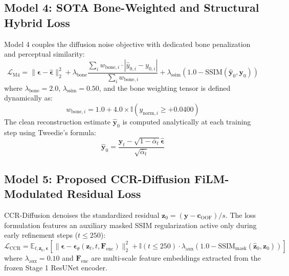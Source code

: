\subsection{Model 4: SOTA Bone-Weighted and Structural Hybrid Loss}
Model 4 couples the diffusion noise objective with dedicated bone penalization and perceptual similarity:
\begin{equation}
\mathcal{L}_{\text{M4}} = \|\boldsymbol{\epsilon} - \hat{\boldsymbol{\epsilon}}\|_2^2 + \lambda_{\text{bone}} \frac{\sum_i w_{\text{bone}, i} \cdot |\hat{y}_{0, i} - y_{0, i}|}{\sum_i w_{\text{bone}, i}} + \lambda_{\text{ssim}} (1.0 - \text{SSIM}(\mathbf{\hat{y}}_0, \mathbf{y}_0))
\label{eq:impl_m4_loss}
\end{equation}
where $\lambda_{\text{bone}} = 2.0$, $\lambda_{\text{ssim}} = 0.50$, and the bone weighting tensor is defined dynamically as:
\begin{equation}
w_{\text{bone}, i} = 1.0 + 4.0 \times \mathbb{I}\left( y_{\text{norm}, i} \ge +0.0400 \right)
\label{eq:bone_weight_def}
\end{equation}
The clean reconstruction estimate $\mathbf{\hat{y}}_0$ is computed analytically at each training step using Tweedie's formula:
\begin{equation}
\mathbf{\hat{y}}_0 = \frac{\mathbf{y}_t - \sqrt{1 - \bar{\alpha}_t}\hat{\boldsymbol{\epsilon}}}{\sqrt{\bar{\alpha}_t}}
\label{eq:tweedie_y0}
\end{equation}

\subsection{Model 5: Proposed CCR-Diffusion FiLM-Modulated Residual Loss}
CCR-Diffusion denoises the standardized residual $\mathbf{z}_0 = (\mathbf{y} - \mathbf{c}_{\text{OOF}}) / s$. The loss formulation features an auxiliary masked SSIM regularization active only during early refinement steps ($t \le 250$):
\begin{equation}
\mathcal{L}_{\text{CCR}} = \mathbb{E}_{t, \mathbf{z}_0, \boldsymbol{\epsilon}} \left[ \|\boldsymbol{\epsilon} - \boldsymbol{\epsilon}_\theta(\mathbf{z}_t, t, \mathbf{F}_{\text{enc}})\|_2^2 + \mathbb{I}(t \le 250) \cdot \lambda_{\text{aux}} (1.0 - \text{SSIM}_{\text{mask}}(\mathbf{\hat{z}}_0, \mathbf{z}_0)) \right]
\label{eq:impl_m5_loss}
\end{equation}
where $\lambda_{\text{aux}} = 0.10$ and $\mathbf{F}_{\text{enc}}$ are multi-scale feature embeddings extracted from the frozen Stage 1 ResUNet encoder.

